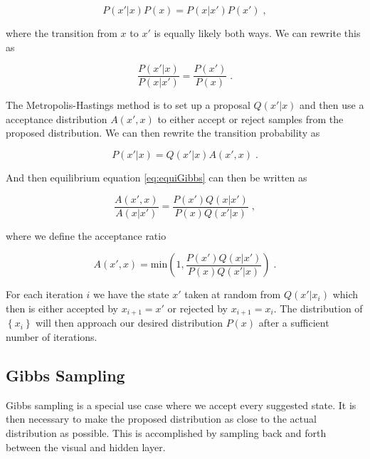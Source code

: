 \begin{equation}
    P(x' | x)P(x) = P(x | x')P(x') \; ,
\end{equation}

where the transition from $x$ to $x'$ is equally likely both ways. We can rewrite this as

\begin{equation} \label{eq:equiGibbs}
    \frac{P(x' | x)}{P(x | x')} = \frac{P(x')}{P(x)} \; .
\end{equation}

The Metropolis-Hastings method is to set up a proposal $Q(x' | x)$ and then use a acceptance distribution $A(x', x)$ to either accept or reject samples from the proposed distribution. We can then rewrite the transition probability as

\begin{equation}
    P(x' | x) = Q(x' | x)A(x', x) \; .
\end{equation}

And then equilibrium equation \ref{eq:equiGibbs} can then be written as

\begin{equation}\label{eq:methas}
    \frac{A(x',  x)}{  A(x | x')} = \frac{P(x')Q(x|x')}{P(x)Q(x'|x)} \; ,
\end{equation}

where we define the acceptance ratio

\begin{equation}
    A(x', x) = \text{min} \left ( 1, \frac{P(x')Q(x|x')}{P(x)Q(x'|x)} \right ) \; .
\end{equation}

For each iteration $i$ we have the state $x'$ taken at random from $Q(x' | x_i)$ which then is either accepted by $x_{i+1} = x'$ or rejected by $x_{i+1} = x_i$. The distribution of $\left \{ x_i \right \}$ will then approach our desired distribution $P(x)$ after a sufficient number of iterations.

\subsection{Gibbs Sampling}

Gibbs sampling is a special use case where we accept every suggested state. It is then necessary to make the proposed distribution as close to the actual distribution as possible. This is accomplished by sampling back and forth between the visual and hidden layer.

